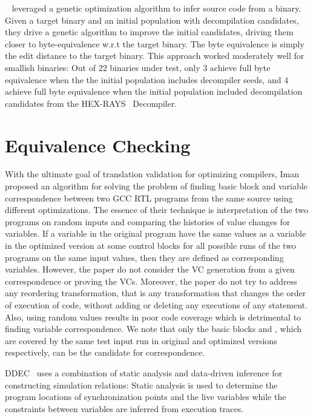~\cite{eschulte2018bed} leveraged a genetic optimization algorithm to infer
source code from a binary. Given a target binary and an initial population with
decompilation candidates, they  drive a genetic algorithm to improve the
initial candidates, driving them closer to byte-equivalence w.r.t the target
binary. The byte equivalence  is simply the edit distance to the target binary.
This approach worked moderately well for smallish binaries: Out of $22$
binaries under test, only $3$ achieve full byte equivalence when the the
initial population includes decompiler seeds, and $4$ achieve full byte
equivalence when the initial population included decompilation candidates  from
the HEX-RAYS~\cite{hexray} Decompiler. 

\section{Equivalence Checking}

With the ultimate goal of translation validation for optimizing compilers, Iman
\etal~\cite{Iman2005} proposed an algorithm for solving the problem of finding
basic block and variable correspondence between two GCC RTL programs from the
same source using different optimizations.  The essence of their technique is
interpretation of the two programs on random inputs and comparing the histories
of value changes for variables. If a variable  in the original program
have the same values as a variable  in the optimized version at some
control blocks for all possible runs of the two programs on the same input
values, then they are defined as corresponding variables. However, the paper do
not consider the VC generation from a given correspondence or proving the VCs.
Moreover, the paper do not try to address any reordering transformation, that
is any transformation that changes the order of execution of code, without
adding or deleting any executions of any statement. Also, using random values
results in poor code coverage which is detrimental to finding variable
correspondence. We note that only the basic blocks  and , which are
covered by the same test input run in original and optimized versions
respectively, can be the candidate for correspondence.     

DDEC~\cite{DDEC:OOPSLA:2013} uses a combination of static analysis and
data-driven inference for constructing simulation relations: Static analysis is
used to determine the program locations of synchronization points and the live
variables while the constraints between variables are inferred from execution
traces.

